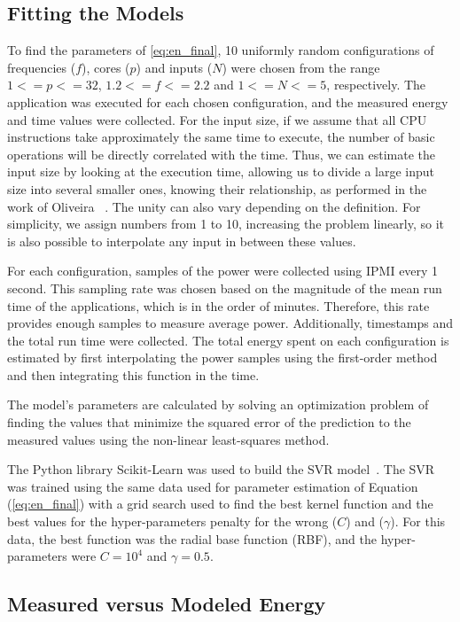 \subsection{Fitting the Models} \label{subsec:fitting}
To find the parameters of  \cref{eq:en_final}, 10 uniformly random configurations of frequencies ($f$), cores ($p$) and inputs ($N$) were chosen from the range $1<=p<=32$, $1.2<=f<=2.2$ and $1<=N<=5$, respectively. The application was executed for each chosen configuration, and the measured energy and time values were collected. For the input size, if we assume that all CPU instructions take approximately the same time to execute, the number of basic operations will be directly correlated with the time. Thus, we can estimate the input size by looking at the execution time, allowing us to divide a large input size into several smaller ones, knowing their relationship, as performed in the work of Oliveira ~\cite{Oliveira2018ApplicationCharacterization}. The unity can also vary depending on the definition. For simplicity, we assign numbers from 1 to 10, increasing the problem linearly, so it is also possible to interpolate any input in between these values.

For each configuration, samples of the power were collected using IPMI every 1 second. This sampling rate was chosen based on the magnitude of the mean run time of the applications, which is in the order of minutes. Therefore, this rate provides enough samples to measure average power. Additionally, timestamps and the total run time were collected. The total energy spent on each configuration is estimated by first interpolating the power samples using the first-order method and then integrating this function in the time.

The model's parameters are calculated by solving an optimization problem of finding the values that minimize the squared error of the prediction to the measured values using the non-linear least-squares method.

The Python library Scikit-Learn was used to build the SVR model~\cite{Pedregosa2011Scikit-learn:Python}. The SVR was trained using the same data used for parameter estimation of Equation (\ref{eq:en_final}) %
with a grid search used to find the best kernel function and the best values for the hyper-parameters penalty for the wrong ($C$) and ($\gamma$). For this data, the best function was the radial base function (RBF), and the hyper-parameters were $C=10^4$ and $\gamma=0.5$.


\subsection{Measured versus Modeled Energy}
\label{subsec:measuredversusmodeledenergy}

